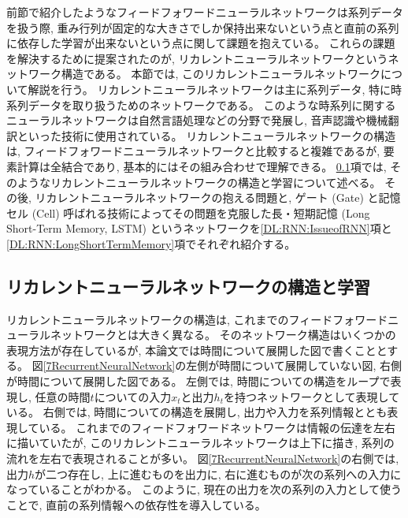前節で紹介したようなフィードフォワードニューラルネットワークは系列データを扱う際, 重み行列が固定的な大きさでしか保持出来ないという点と直前の系列に依存した学習が出来ないという点に関して課題を抱えている。
これらの課題を解決するために提案されたのが, リカレントニューラルネットワークというネットワーク構造である。
本節では, このリカレントニューラルネットワークについて解説を行う。
リカレントニューラルネットワークは主に系列データ, 特に時系列データを取り扱うためのネットワークである。
このような時系列に関するニューラルネットワークは自然言語処理などの分野で発展し, 音声認識や機械翻訳といった技術に使用されている。
リカレントニューラルネットワークの構造は, フィードフォワードニューラルネットワークと比較すると複雑であるが, 要素計算は全結合であり, 基本的にはその組み合わせで理解できる。
\ref{DL:RNN:ReccurentNeuralNetwork}項では, そのようなリカレントニューラルネットワークの構造と学習について述べる。
その後, リカレントニューラルネットワークの抱える問題と, ゲート (Gate) と記憶セル (Cell) 呼ばれる技術によってその問題を克服した長・短期記憶 (Long Short-Term Memory, LSTM\cite{LSTMpaper}) というネットワークを\ref{DL:RNN:IssueofRNN}項と\ref{DL:RNN:LongShortTermMemory}項でそれぞれ紹介する。


\subsection{リカレントニューラルネットワークの構造と学習} \label{DL:RNN:ReccurentNeuralNetwork}

リカレントニューラルネットワークの構造は, これまでのフィードフォワードニューラルネットワークとは大きく異なる。
そのネットワーク構造はいくつかの表現方法が存在しているが, 本論文では時間について展開した図で書くこととする。
図\ref{7RecurrentNeuralNetwork}の左側が時間について展開していない図, 右側が時間について展開した図である。
左側では, 時間についての構造をループで表現し, 任意の時間$t$についての入力$x_t$と出力$h_t$を持つネットワークとして表現している。
右側では, 時間についての構造を展開し, 出力や入力を系列情報ととも表現している。
これまでのフィードフォワードネットワークは情報の伝達を左右に描いていたが, このリカレントニューラルネットワークは上下に描き, 系列の流れを左右で表現されることが多い。
図\ref{7RecurrentNeuralNetwork}の右側では, 出力$h$が二つ存在し, 上に進むものを出力に, 右に進むものが次の系列への入力になっていることがわかる。
このように, 現在の出力を次の系列の入力として使うことで, 直前の系列情報への依存性を導入している。

